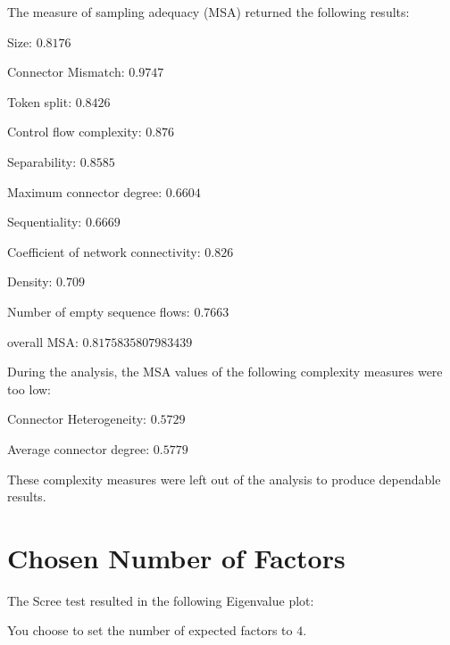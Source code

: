 \documentclass[a4paper]{article}
\begin{document}
The measure of sampling adequacy (MSA) returned the following results:
\begin{compactitem}
\item Size: $0.8176$
\item Connector Mismatch: $0.9747$
\item Token split: $0.8426$
\item Control flow complexity: $0.876$
\item Separability: $0.8585$
\item Maximum connector degree: $0.6604$
\item Sequentiality: $0.6669$
\item Coefficient of network connectivity: $0.826$
\item Density: $0.709$
\item Number of empty sequence flows: $0.7663$
\item overall MSA: $0.8175835807983439$
\end{compactitem}

\noindent
During the analysis, the MSA values of the following complexity measures were too low:
\begin{compactitem}
\item Connector Heterogeneity: $0.5729$
\item Average connector degree: $0.5779$
\end{compactitem}
These complexity measures were left out of the analysis to produce dependable results.

\section*{Chosen Number of Factors}
The Scree test resulted in the following Eigenvalue plot:
\begin{center}
\end{center}
You choose to set the number of expected factors to $4$.
\end{document}
